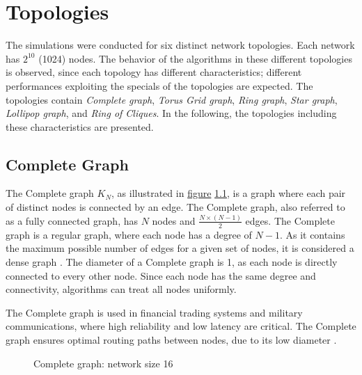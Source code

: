 \chapter{Topologies}\label{chap:topologies}
The simulations were conducted for six distinct network topologies. Each network has $2^{10}$ (1024) nodes. The behavior of the algorithms in these different topologies is observed, since each topology has different characteristics; different performances exploiting the specials of the topologies are expected. The topologies contain \textit{Complete graph}, \textit{Torus Grid graph}, \textit{Ring graph}, \textit{Star graph}, \textit{Lollipop graph}, and \textit{Ring of Cliques}. In the following, the topologies including these characteristics are presented.

\section{Complete Graph}\label{sec:2completegraph}
The Complete graph $K_N$, as illustrated in \hyperref[fig:completegraphDemo]{figure} \ref{fig:completegraphDemo}, is a graph where each pair of distinct nodes is connected by an edge. The Complete graph, also referred to as a fully connected graph, has $N$ nodes and $\frac{N\times(N-1)}{2}$ edges. The Complete graph is a regular graph, where each node has a degree of $N-1$. As it contains the maximum possible number of edges for a given set of nodes, it is considered a dense graph \cite{GraphTheorySchindelhaauer2021}. The diameter of a Complete graph is 1, as each node is directly connected to every other node. Since each node has the same degree and connectivity, algorithms can treat all nodes uniformly.

The Complete graph is used in financial trading systems and military communications, where high reliability and low latency are critical. The Complete graph ensures optimal routing paths between nodes, due to its low diameter \cite{Banerjee2001}.

\begin{figure}[H]
    \centering
    
    \caption{Complete graph: network size 16}
    \label{fig:completegraphDemo}
\end{figure}
 
